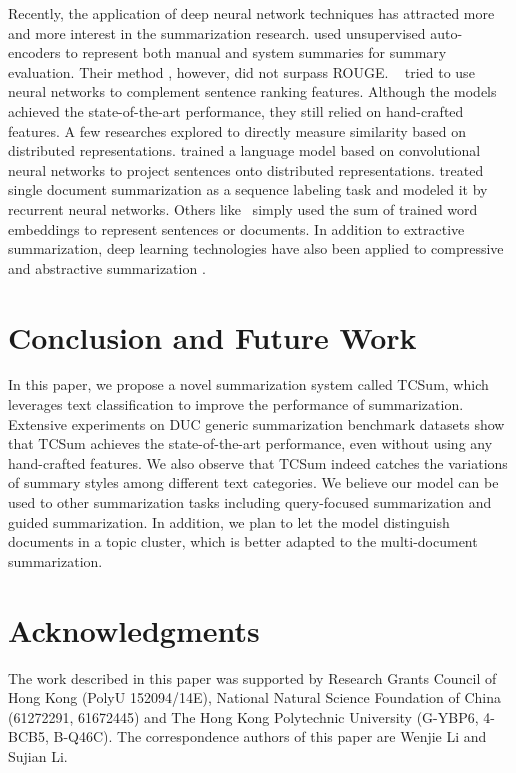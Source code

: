 \documentclass[letterpaper]{article}
\begin{document}
Recently, the application of deep neural network techniques has attracted more and more interest in the summarization research.
\cite{genest2011deep} used unsupervised auto-encoders to represent both manual and system summaries for summary evaluation.
Their method , however, did not surpass ROUGE.
~\cite{cao2015ranking,cao2015learning} tried to use neural networks to complement sentence ranking features.
Although the models achieved the state-of-the-art performance, they still relied on hand-crafted features.
A few researches explored to directly measure similarity based on distributed representations.
\cite{yin2015optimizing} trained a language model based on convolutional neural networks to project sentences onto distributed representations.
\cite{cheng2016neural} treated single document summarization as a sequence labeling task and modeled it by recurrent neural networks.
Others like~\cite{kobayashi-noguchi-yatsuka:2015:EMNLP} simply used the sum of trained word embeddings to represent sentences or documents.
In addition to extractive summarization, deep learning technologies have also been applied to compressive and abstractive summarization \cite{filippova-EtAl:2015:EMNLP,rush-chopra-weston:2015:EMNLP}.

\vspace{-1.49mm}
\section{Conclusion and Future Work}
In this paper, we propose a novel summarization system called TCSum, which leverages text classification to improve the performance of summarization.
Extensive experiments on DUC generic summarization benchmark datasets show that TCSum achieves the state-of-the-art performance, even without using any hand-crafted features.
We also observe that TCSum indeed catches the variations of summary styles among different text categories.
We believe our model can be used to other summarization tasks including query-focused summarization and guided summarization.
In addition, we plan to let the model distinguish documents in a topic cluster, which is better adapted to the multi-document summarization.

\vspace{-1.70mm}
\section{ Acknowledgments}
The work described in this paper was supported by Research Grants Council of Hong Kong (PolyU 152094/14E), National Natural Science Foundation of China (61272291, 61672445) and The Hong Kong Polytechnic University (G-YBP6, 4-BCB5, B-Q46C).
The correspondence authors of this paper are Wenjie Li and Sujian Li.
\end{document}
